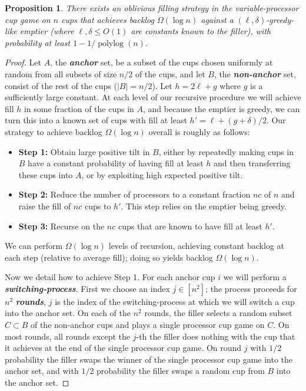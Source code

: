 \documentclass[twocolumn]{article}[11pt]
\newcommand{\defn}[1]{{\textit{\textbf{\boldmath #1}}}}
\DeclareMathOperator{\polylog}{\text{polylog}}
\newtheorem{proposition}{Proposition}
\begin{document}
\begin{proposition}
  \label{prop:obliviousBase}
  There exists an oblivious filling strategy in the variable-processor cup game
  on $n$ cups that achieves backlog $\Omega(\log n)$ against a $(\ell,
  \delta)$-greedy-like emptier (where $\ell, \delta \le O(1)$ are constants
  known to the filler), with probability at least $1-1/\polylog(n)$.
\end{proposition}
\begin{proof}
  Let $A$, the \defn{anchor} set, be a subset of the cups chosen uniformly at
  random from all subsets of size $n/2$ of the cups, and let $B$, the
  \defn{non-anchor} set, consist of the rest of the cups ($|B| = n/2$). 
  Let $h = 2 \ell + g $ where $g$ is a sufficiently large constant. At each
  level of our recursive procedure we will achieve fill $h$ in some fraction of
  the cups in $A$, and because the emptier is greedy, we can turn this into a
  known set of cups with fill at least $h' = \ell + (g+\delta)/2$.
  Our strategy to achieve backlog $\Omega(\log n)$ overall is roughly as follows:
  \begin{itemize}
    \item \textbf{Step 1:} 
      Obtain large positive tilt in $B$, either by repeatedly making cups in $B$ have a constant probability of having
      fill at least $h$ and then transferring these cups into $A$, or by
      exploiting high expected positive tilt.
  \item \textbf{Step 2:} Reduce the number of processors to a constant fraction $nc$ of $n$ and
    raise the fill of $nc$ cups to $h'$. This step relies on the emptier being
    greedy.
  \item \textbf{Step 3:} Recurse on the $nc$ cups that are known to have fill at least $h'$.
\end{itemize}
We can perform $\Omega(\log n)$ levels of recursion, achieving constant backlog
at each step (relative to average fill); doing so yields backlog $\Omega(\log
n)$.

Now we detail how to achieve Step 1.
For each anchor cup $i$ we will perform a \defn{switching-process}.
First we choose an index $j \in [n^2]$; the process proceeds for $n^2$
\defn{rounds}, $j$ is the index of the switching-process at which we will
switch a cup into the anchor set.
On each of the $n^2$ rounds, the filler selects a random subset $C\subset B$ of
the non-anchor cups and plays a single processor cup game on $C$.
On most rounds, all rounds except the $j$-th the filler does nothing with the
cup that it achieves at the end of the single processor cup game.
On round $j$ with $1/2$ probability the filler swaps the winner of the single processor
cup game into the anchor set, and with $1/2$ probability the filler swaps a random cup
from $B$ into the anchor set.


\end{proof}
\end{document}
